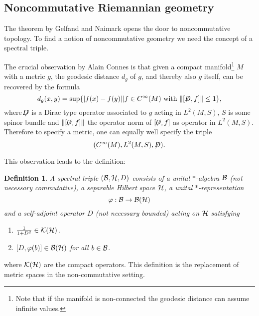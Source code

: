 \documentclass[12pt]{article}
\newcommand{\nn}{\nonumber}
\def\cb{{\cal B}}
\def\ch{{\cal H}}
\def\ck{{\cal K}}
\newtheorem{definition}[thm]{Definition}
\begin{document}
\subsection{Noncommutative Riemannian geometry }

The theorem by Gelfand and Naimark opens the door to noncommutative topology. To find a notion of noncommutative geometry we need the concept of a spectral triple. 

The crucial observation by Alain Connes is that given a compact manifold\footnote{Note that if the manifold is non-connected the geodesic distance can assume infinite values.} $M$ with a metric $g$, the geodesic distance $d_g$ of $g$, and thereby also $g$ itself, can be recovered by the formula 
\begin{equation} d_g(x,y)=\sup \{ |f(x)-f(y)| |f\in C^\infty (M)\hbox{ with } \| [ \not\hspace{-1mm} D,f]\| \leq 1   \}   , \label{connesdist}\nn
\end{equation}
where $ \not\hspace{-1,8mm} D$ is a Dirac type operator associated to $g$ acting in $L^2 (M,S)$, $S$ is some spinor bundle and $\|[ \not\hspace{-1.5mm} D,f]\|$ the operator norm of $[ \not\hspace{-1.5mm} D,f]$ as operator in $L^2 (M,S)$. Therefore to specify a metric, one can equally well specify the triple
\begin{equation} (C^\infty (M), L^2(M,S),  \not\hspace{-1mm} D). \nonumber\end{equation}

This observation leads to the definition:
\begin{definition} \label{spectrip}
A spectral triple $(\cb , \ch ,D)$ consists of a unital $*$-algebra   $\cb$ (not necessary commutative), a separable Hilbert space $\ch$, a unital $*$-representation 
\begin{equation}\varphi : \cb \to \cb (\ch) \nonumber\end{equation}
and a  self-adjoint operator $D$ (not necessary bounded) acting on $\ch$ satisfying
\begin{enumerate}  
\item $\frac{1}{1+D^2} \in \ck (\ch)$.
\item $[D,\varphi (b)]\in \cb(\ch)$ for all $b\in \cb  $. 
\end{enumerate}
\end{definition}
where $\ck(\ch)$ are the compact operators.
This definition is the replacement of metric spaces in the non-commutative setting. 
\end{document}
